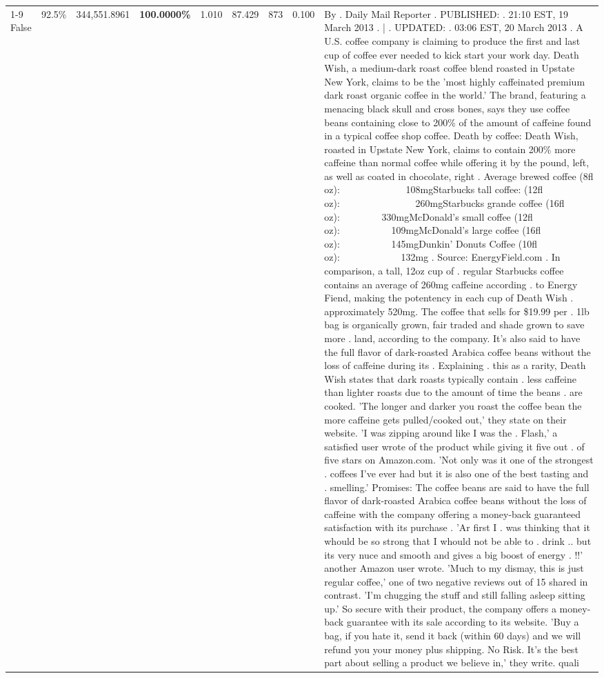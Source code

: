 \begin{table}[H]
{\begin{tabular}{lllrlllll}
\cline{1-9} \cline{2-9}
False & 92.5\% & 344,551.8961 & \bfseries \color{red} 100.0000\% & 1.010 & 87.429 & 873 & 0.100 & By . Daily Mail Reporter . PUBLISHED: . 21:10 EST, 19 March 2013 . | . UPDATED: . 03:06 EST, 20 March 2013 . A U.S. coffee company is claiming to produce the first and last cup of coffee ever needed to kick start your work day. Death Wish, a medium-dark roast coffee blend roasted in Upstate New York, claims to be the 'most highly caffeinated premium dark roast organic coffee in the world.' The brand, featuring a menacing black skull and cross bones, says they use coffee beans containing close to 200\% of the amount of caffeine found in a typical coffee shop coffee. Death by coffee: Death Wish, roasted in Upstate New York, claims to contain 200\% more caffeine than normal coffee while offering it by the pound, left, as well as coated in chocolate, right . Average brewed coffee (8fl oz):              108mgStarbucks tall coffee: (12fl oz):                260mgStarbucks grande coffee (16fl oz):         330mgMcDonald's small coffee (12fl oz):           109mgMcDonald's large coffee (16fl oz):           145mgDunkin' Donuts Coffee (10fl oz):             132mg . Source: EnergyField.com . In comparison, a tall, 12oz cup of . regular Starbucks coffee contains an average of 260mg caffeine according . to Energy Fiend, making the potentency in each cup of Death Wish . approximately 520mg. The coffee that sells for \$19.99 per . 1lb bag is organically grown, fair traded and shade grown to save more . land, according to the company. It's also said to have the full flavor of dark-roasted Arabica coffee beans without the loss of caffeine during its . Explaining . this as a rarity, Death Wish states that dark roasts typically contain . less caffeine than lighter roasts due to the amount of time the beans . are cooked. 'The longer and darker you roast the coffee bean the more caffeine gets pulled/cooked out,' they state on their website. 'I was zipping around like I was the . Flash,' a satisfied user wrote of the product while giving it five out . of five stars on Amazon.com. 'Not only was it one of the strongest . coffees I've ever had but it is also one of the best tasting and . smelling.’ Promises: The coffee beans are said to have the full flavor of dark-roasted Arabica coffee beans without the loss of caffeine with the company offering a money-back guaranteed satisfaction with its purchase . 'Ar first I . was thinking that it whould be so strong that I whould not be able to . drink .. but its very nuce and smooth and gives a big boost of energy . !!' another Amazon user wrote. 'Much to my dismay, this is just regular coffee,' one of two negative reviews out of 15 shared in contrast. 'I'm chugging the stuff and still falling asleep sitting up.' So secure with their product, the company offers a money-back guarantee with its sale according to its website. 'Buy a bag, if you hate it, send it back (within 60 days) and we will refund you your money plus shipping. No Risk. It’s the best part about selling a product we believe in,' they write. quali \\

\end{tabular}}
\end{table}
